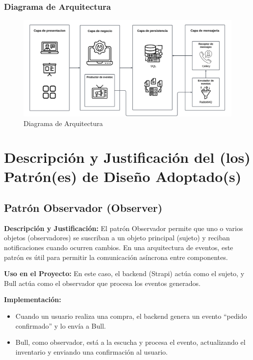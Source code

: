 \documentclass[12pt]{article}
\begin{document}
\subsubsection{Diagrama de Arquitectura}
\begin{figure}[H]
    \centering
    \includegraphics[width=\textwidth]{img/DiagramaArquitectura.pdf}
    \caption{Diagrama de Arquitectura}
    \label{fig:diagrama_arquitectura}
\end{figure}

\section{Descripción y Justificación del (los) Patrón(es) de Diseño Adoptado(s)}

\subsection{Patrón Observador (Observer)}
\textbf{Descripción y Justificación:} El patrón Observador permite que uno o varios objetos (observadores) se suscriban a un objeto principal (sujeto) y reciban notificaciones cuando ocurren cambios. En una arquitectura de eventos, este patrón es útil para permitir la comunicación asíncrona entre componentes.

\textbf{Uso en el Proyecto:} En este caso, el backend (Strapi) actúa como el sujeto, y Bull actúa como el observador que procesa los eventos generados.

\textbf{Implementación:}
\begin{itemize}
    \item Cuando un usuario realiza una compra, el backend genera un evento “pedido confirmado” y lo envía a Bull.
    \item Bull, como observador, está a la escucha y procesa el evento, actualizando el inventario y enviando una confirmación al usuario.
\end{itemize}
\end{document}
